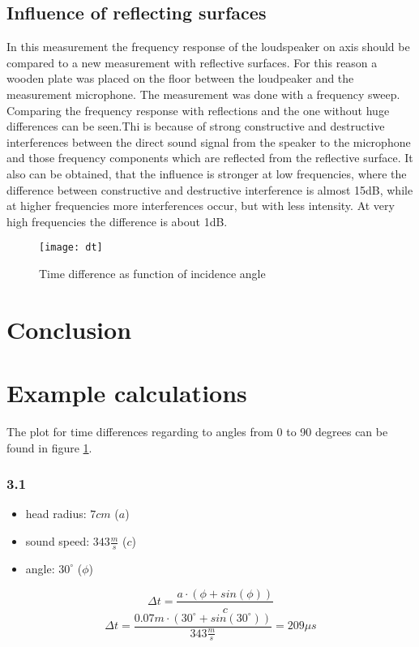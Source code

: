 \documentclass{article}
\begin{document}
\subsection{Influence of reflecting surfaces}
In this measurement the frequency response of the loudspeaker on axis should be compared to a new measurement with reflective surfaces. For this reason a wooden plate was placed on the floor between the loudpeaker and the measurement microphone. The measurement was done with a frequency sweep. Comparing the frequency response with reflections and the one without huge differences can be seen.Thi is because of strong constructive and destructive interferences between the direct sound signal from the speaker to the microphone and those frequency components which are reflected from the reflective surface.  It also can be obtained, that the influence is stronger at low frequencies, where the difference between constructive and destructive interference is almost 15dB, while at higher frequencies more interferences occur, but with less intensity. At very high frequencies the difference is about 1dB.
\begin{figure}[htbp]
\begin{center}
\texttt{[image: dt]}
\caption{Time difference as function of incidence angle}
\label{fig:dt}
\end{center}
\end{figure}



\newpage
\section{Conclusion}

\newpage
\appendix
\section{Example calculations}
The plot for time differences regarding to angles from 0 to 90 degrees can be found in figure \ref{fig:dt}.

\subsubsection{3.1}
\begin{itemize}
\item head radius: $7cm$ ($a$)
\item sound speed: $343\frac{m}{s}$ ($c$)
\item angle: $30^\circ$ ($\phi$)
\end{itemize}
\begin{equation}
\Delta t=\frac{a\cdot(\phi+sin(\phi))}{c}
\end{equation}
$$\Delta t=\frac{0.07m\cdot(30^\circ+sin(30^\circ))}{343\frac{m}{s}}=209\mu s $$
\end{document}
